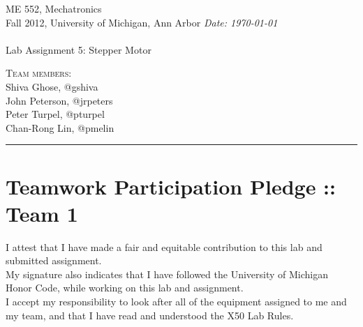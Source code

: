 \documentclass{article}
\newcommand{\shortbar}{\begin{center}\rule{5ex}{0.1pt}\end{center}}
\newcommand{\courseNumber}{ME 552}
\newcommand{\courseTitle}{Mechatronics}
\newcommand{\semester}{Fall 2012}
\theoremstyle{plain}
\theoremstyle{definition}
\theoremstyle{remark}
\newenvironment{solution}[1]{\medskip\noindent{\bf Problem #1.~}}{\shortbar}
\newcommand{\solutions}[4]{
\vspace{-2ex}
\begin{center}
{\small  \courseNumber, \courseTitle
\hfill {\Large \bf {#1} }\\
\semester, University of Michigan, Ann Arbor \hfill
{\em Date: #3}}\\
\vspace{-1ex}
\hrulefill\\
\vspace{4ex}
{\LARGE Lab Assignment #2}\\
\vspace{2ex}
\end{center}
\begin{trivlist}
\item \textsc{Team members:\\} {#4}
\end{trivlist}
\noindent
\shortbar
\vspace{3ex}
}
\begin{document}
\solutions{}{5: Stepper Motor}{\today}{Shiva Ghose, @gshiva\\ John Peterson, @jrpeters\\ Peter Turpel, @pturpel\\ Chan-Rong Lin, @pmelin}
%
%
\section*{Teamwork Participation Pledge :: Team 1}

I attest that I have made a fair and equitable contribution to this lab and submitted 
assignment. \\

My signature also indicates that I have followed the University of Michigan Honor Code, 
while working on this lab and assignment.\\

I accept my responsibility to look after all of the equipment assigned to me and my team, 
and that I have read and understood the X50 Lab Rules.\\
\end{document}
